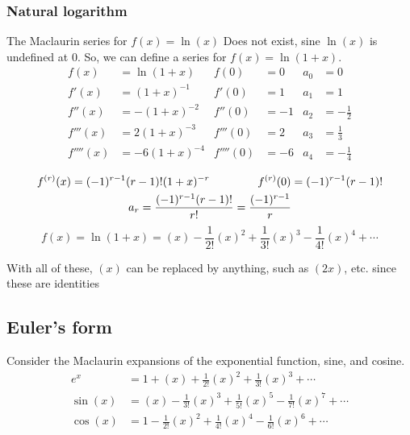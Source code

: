\documentclass[11pt, a4paper]{article}
\begin{document}
\subsubsection*{Natural logarithm}
The Maclaurin series for $f(x)=\ln(x)$ Does not exist, sine $\ln(x)$ is undefined at $0$. So, we can define a series for $f(x)=\ln(1+x)$.
\begin{align*}
f(x)&=\ln(1+x) & f(0)&=0 & a_{0}&=0 \\
f'(x)&=(1+x)^{-1} & f'(0)&=1 & a_{1}&=1 \\
f''(x)&=-(1+x)^{-2} & f''(0)&=-1 & a_{2}&=-\frac{1}{2} \\
f'''(x)&=2(1+x)^{-3} & f'''(0)&=2 & a_{3}&=\frac{1}{3} \\
f''''(x)&=-6(1+x)^{-4} & f''''(0)&=-6 & a_{4}&=-\frac{1}{4} \\
\end{align*}
\vspace{-.8cm}
\begin{gather*}
f^{(r)}(x)=(-1)^{r-1}(r-1)!(1+x)^{-r} \hspace{1.5cm} f^{(r)}(0)=(-1)^{r-1}(r-1)! \\
 a_{r}=\frac{(-1)^{r-1}(r-1)!}{r!}=\frac{(-1)^{r-1}}{r}
\end{gather*}
\begin{equation*}
f(x)=\ln(1+x)=(x)-\frac{1}{2!}(x)^{2}+\frac{1}{3!}(x)^{3}-\frac{1}{4!}(x)^{4}+\cdots
\end{equation*}
\newline \par
\vspace{-.3cm}
With all of these, $(x)$ can be replaced by anything, such as $(2x)$, etc. since these are identities
\vspace{0.5cm}


\subsection{Euler's form}
\label{eulersform}
Consider the Maclaurin expansions of the exponential function, sine, and cosine.
\begin{align*}
e^{x}&=1+(x)+\frac{1}{2!}(x)^{2}+\frac{1}{3!}(x)^{3}+\cdots \\
\sin(x)&=(x)-\frac{1}{3!}(x)^{3}+\frac{1}{5!}(x)^{5}-\frac{1}{7!}(x)^{7}+\cdots \\
\cos(x)&=1-\frac{1}{2!}(x)^{2}+\frac{1}{4!}(x)^{4}-\frac{1}{6!}(x)^{6}+\cdots
\end{align*} \newline \par
\end{document}
